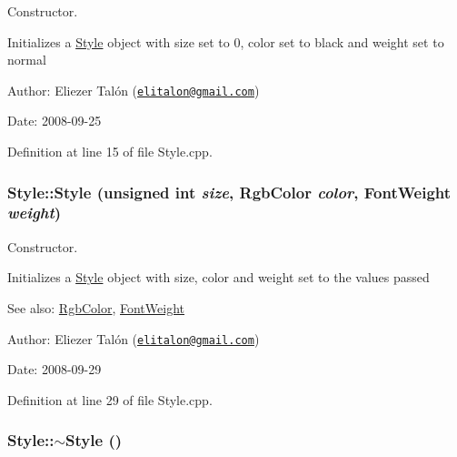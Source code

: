 Constructor. 

Initializes a \hyperlink{class_style}{Style} object with size set to 0, color set to black and weight set to normal

\begin{Desc}
\item[Author:]Eliezer Talón (\href{mailto:elitalon@gmail.com}{\tt elitalon@gmail.com}) \end{Desc}
\begin{Desc}
\item[Date:]2008-09-25 \end{Desc}


Definition at line 15 of file Style.cpp.\hypertarget{class_style_69801b8ce2b1520ef24e1a84d04609e5}{
\subsubsection[Style]{\setlength{\rightskip}{0pt plus 5cm}Style::Style (unsigned int {\em size}, \/  {\bf RgbColor} {\em color}, \/  {\bf FontWeight} {\em weight})}}
\label{class_style_69801b8ce2b1520ef24e1a84d04609e5}


Constructor. 

Initializes a \hyperlink{class_style}{Style} object with size, color and weight set to the values passed

\begin{Desc}
\item[See also:]\hyperlink{struct_rgb_color}{RgbColor}, \hyperlink{_font_weight_8h_ecff23ba4a68486421bcea57e095fe66}{FontWeight}\end{Desc}
\begin{Desc}
\item[Author:]Eliezer Talón (\href{mailto:elitalon@gmail.com}{\tt elitalon@gmail.com}) \end{Desc}
\begin{Desc}
\item[Date:]2008-09-29 \end{Desc}


Definition at line 29 of file Style.cpp.\hypertarget{class_style_7c798ef9b77bc94719542feade497725}{
\subsubsection[$\sim$Style]{\setlength{\rightskip}{0pt plus 5cm}Style::$\sim$Style ()}}
\label{class_style_7c798ef9b77bc94719542feade497725}


